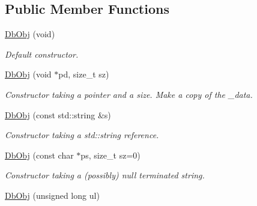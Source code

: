 \subsection*{Public Member Functions}
\begin{CompactItemize}
\item 
\hypertarget{classutil_1_1DbObj_46bd24be85b68ed873f666fbd7ce7c1a}{
\hyperlink{classutil_1_1DbObj_46bd24be85b68ed873f666fbd7ce7c1a}{DbObj} (void)}
\label{classutil_1_1DbObj_46bd24be85b68ed873f666fbd7ce7c1a}

\begin{CompactList}\small\item\em Default constructor. \item\end{CompactList}\item 
\hypertarget{classutil_1_1DbObj_2e027cc833635b3605019a700d89204e}{
\hyperlink{classutil_1_1DbObj_2e027cc833635b3605019a700d89204e}{DbObj} (void $\ast$pd, size\_\-t sz)}
\label{classutil_1_1DbObj_2e027cc833635b3605019a700d89204e}

\begin{CompactList}\small\item\em Constructor taking a pointer and a size. Make a copy of the \_\-data. \item\end{CompactList}\item 
\hypertarget{classutil_1_1DbObj_720ec59f22fb852f5c3ba05eafd929bb}{
\hyperlink{classutil_1_1DbObj_720ec59f22fb852f5c3ba05eafd929bb}{DbObj} (const std::string \&s)}
\label{classutil_1_1DbObj_720ec59f22fb852f5c3ba05eafd929bb}

\begin{CompactList}\small\item\em Constructor taking a std::string reference. \item\end{CompactList}\item 
\hypertarget{classutil_1_1DbObj_040ba9bb33234312d548d872abb0f2d5}{
\hyperlink{classutil_1_1DbObj_040ba9bb33234312d548d872abb0f2d5}{DbObj} (const char $\ast$ps, size\_\-t sz=0)}
\label{classutil_1_1DbObj_040ba9bb33234312d548d872abb0f2d5}

\begin{CompactList}\small\item\em Constructor taking a (possibly) null terminated string. \item\end{CompactList}\item 
\hypertarget{classutil_1_1DbObj_62f11587e8f18e0651899a705a81cb57}{
\hyperlink{classutil_1_1DbObj_62f11587e8f18e0651899a705a81cb57}{DbObj} (unsigned long ul)}
\label{classutil_1_1DbObj_62f11587e8f18e0651899a705a81cb57}


\end{CompactItemize}
